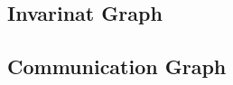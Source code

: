\subsection{Invarinat Graph}
\label{invariant-graph}

\subsection{Communication Graph}
\label{communication-graph}
